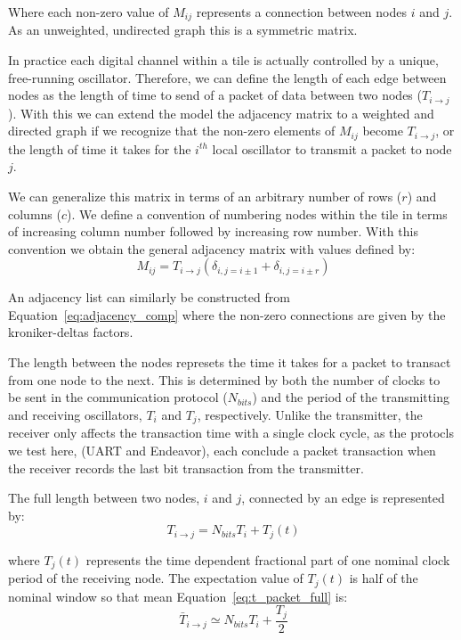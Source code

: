 Where each non-zero value of $M_{ij}$ represents a connection between nodes $i$ and $j$.
As an unweighted, undirected graph this is a symmetric matrix.

In practice each digital channel within a tile is actually controlled by a unique, free-running oscillator.
Therefore, we can define the length of each edge between nodes as the length of time to send of a packet of data between two nodes ($T_{i\rightarrow j}$).
With this we can extend the model the adjacency matrix to a weighted and directed graph if we recognize that the non-zero elements of $M_{ij}$ become $T_{i\rightarrow j}$, or the length of time it takes for the $i^{th}$ local oscillator to transmit a packet to node $j$.

We can generalize this matrix in terms of an arbitrary number of rows ($r$) and columns ($c$).
We define a convention of numbering nodes within the tile in terms of increasing column number followed by increasing row number.
With this convention we obtain the general adjacency matrix with values defined by:
\begin{equation}~\label{eq:adjacency_comp}
  M_{ij} = T_{i\rightarrow j}(\delta_{i,j=i\pm 1} + \delta_{i,j=i\pm r})
\end{equation}

An adjacency list can similarly be constructed from Equation~\ref{eq:adjacency_comp} where the non-zero connections are given by the kroniker-deltas factors.

The length between the nodes represets the time it takes for a packet to transact from one node to the next.
This is determined by both the number of clocks to be sent in the communication protocol ($N_{bits}$) and the period of the transmitting and receiving oscillators, $T_{i}$ and $T_{j}$, respectively.
Unlike the transmitter, the receiver only affects the transaction time with a single clock cycle, as the protocls we test here, (UART and Endeavor), each conclude a packet transaction when the receiver records the last bit transaction from the transmitter.

The full length between two nodes, $i$ and $j$, connected by an edge is represented by:
\begin{equation}~\label{eq:t_packet_full}
T_{i\rightarrow j} = N_{bits}T_{i} + T_{j}(t)
\end{equation}

where $T_{j}(t)$ represents the time dependent fractional part of one nominal clock period of the receiving node.
The expectation value of $T_{j}(t)$ is half of the nominal window so that mean Equation~\ref{eq:t_packet_full} is:
\begin{equation}~\label{eq:t_packet_avg}
\bar{T}_{i\rightarrow j} \simeq N_{bits}T_{i} + \frac{T_{j}}{2}
\end{equation}

